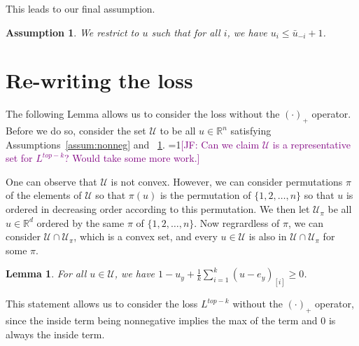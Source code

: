 \documentclass[12pt]{article}
\newcommand{\Comments}{1}
\newcommand{\mynote}[2]{\ifnum\Comments=1\textcolor{#1}{#2}\fi}
\newcommand{\raf}[1]{\mynote{green}{[RF: #1]}}
\newcommand{\jessie}[1]{\mynote{purple}{[JF: #1]}}
\newcommand{\reals}{\mathbb{R}}
\newcommand{\U}{\mathcal{U}}
\newtheorem{lemma}{Lemma}
\newtheorem{assumption}{Assumption}
\begin{document}
This leads to our final assumption.
\begin{assumption}\label{assum:top-threshold}
	We restrict to $u$ such that for all $i$, we have $u_i \leq \bar u_{-i} +1$.
\end{assumption}



\section{Re-writing the loss}
The following Lemma allows us to consider the loss without the $(\cdot)_+$ operator.
Before we do so, consider the set $\U$ to be all $u \in \reals^n$ satisfying Assumptions~\ref{assum:nonneg} and ~\ref{assum:top-threshold}.
\jessie{Can we claim $\U$ is a representative set for $L^{top-k}$?  Would take some more work.}

One can observe that $\U$ is not convex.
However, we can consider permutations $\pi$ of the elements of $\U$ so that $\pi(u)$ is the permutation of $\{1,2,\ldots, n\}$ so that $u$ is ordered in decreasing order according to this permutation.
We then let $\U_\pi$ be all $u \in \reals^d$ ordered by the same $\pi$ of $\{1,2,\ldots,n\}$.
Now regrardless of $\pi$, we can consider $\U \cap \U_\pi$, which is a convex set, and every $u \in \U$ is also in $\U \cap \U_{\pi}$ for some $\pi$.

%

\begin{lemma}\label{lem:get-rid-max-op}
	For all $u \in \U$, we have $1 -u_y + \frac{1}{k} \sum_{i=1}^k (u - e_y)_{[i]} \geq 0$.
\end{lemma}
This statement allows us to consider the loss $L^{top-k}$ without the $(\cdot)_+$ operator, since the inside term being nonnegative implies the max of the term and $0$ is always the inside term.
\end{document}
